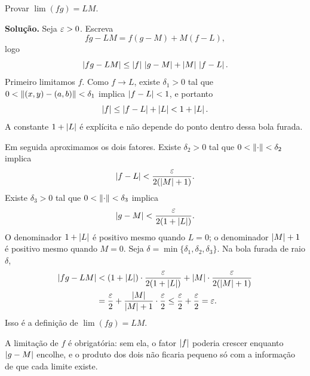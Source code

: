 \documentclass[11pt,a4paper]{article}
\begin{document}
\begin{exercicio}
Provar $\lim(fg)=LM$.

\textbf{Solução.}
Seja $\varepsilon>0$. Escreva
\[
fg-LM=f(g-M)+M(f-L),
\]
logo
\[
\left\lvert fg-LM \right\rvert\le\left\lvert f \right\rvert\,\left\lvert g-M \right\rvert+\left\lvert M \right\rvert\,\left\lvert f-L \right\rvert.
\]
Primeiro limitamos $f$. Como $f\to L$, existe $\delta_1>0$ tal que $0<\left\lVert (x,y)-(a,b) \right\rVert<\delta_1$ implica $\left\lvert f-L \right\rvert<1$, e portanto
\[
\left\lvert f \right\rvert\le\left\lvert f-L \right\rvert+\left\lvert L \right\rvert<1+\left\lvert L \right\rvert.
\]
A constante $1+\left\lvert L \right\rvert$ é explícita e não depende do ponto dentro dessa bola furada.

Em seguida aproximamos os dois fatores. Existe $\delta_2>0$ tal que $0<\left\lVert \cdot \right\rVert<\delta_2$ implica
\[
\left\lvert f-L \right\rvert<\frac{\varepsilon}{2(\left\lvert M \right\rvert+1)}.
\]
Existe $\delta_3>0$ tal que $0<\left\lVert \cdot \right\rVert<\delta_3$ implica
\[
\left\lvert g-M \right\rvert<\frac{\varepsilon}{2(1+\left\lvert L \right\rvert)}.
\]
O denominador $1+\left\lvert L \right\rvert$ é positivo mesmo quando $L=0$; o denominador $\left\lvert M \right\rvert+1$ é positivo mesmo quando $M=0$. Seja $\delta=\min\{\delta_1,\delta_2,\delta_3\}$. Na bola furada de raio $\delta$,
\begin{align*}
\left\lvert fg-LM \right\rvert
&<(1+\left\lvert L \right\rvert)\cdot\frac{\varepsilon}{2(1+\left\lvert L \right\rvert)}
+\left\lvert M \right\rvert\cdot\frac{\varepsilon}{2(\left\lvert M \right\rvert+1)}\\
&=\frac{\varepsilon}{2}+\frac{\left\lvert M \right\rvert}{\left\lvert M \right\rvert+1}\cdot\frac{\varepsilon}{2}
\le\frac{\varepsilon}{2}+\frac{\varepsilon}{2}
=\varepsilon.
\end{align*}
Isso é a definição de $\lim(fg)=LM$.

A limitação de $f$ é obrigatória: sem ela, o fator $\left\lvert f \right\rvert$ poderia crescer enquanto $\left\lvert g-M \right\rvert$ encolhe, e o produto dos dois não ficaria pequeno só com a informação de que cada limite existe.
\end{exercicio}
\end{document}
